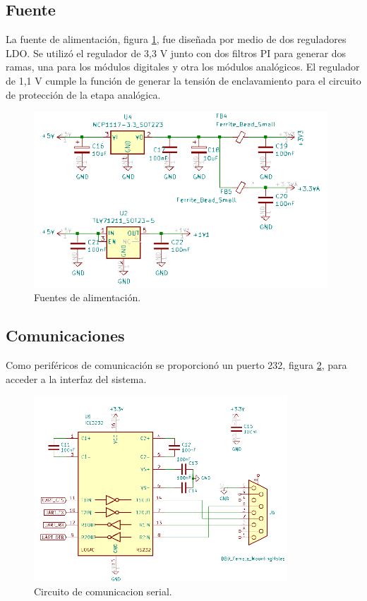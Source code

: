 \subsection{Fuente}

La fuente de alimentación, figura \ref{fig:schPwr}, fue diseñada por medio de dos reguladores LDO. Se utilizó el regulador de 3,3 V junto con dos filtros PI para generar dos ramas, una para los módulos digitales y otra los módulos analógicos. El regulador de 1,1 V cumple la función de generar la tensión de enclavamiento para el circuito de protección de la etapa analógica.


\begin{figure}[ht]
	\centering
	\includegraphics[width=110mm]{./Figures/schPwr.png}
	\caption{Fuentes de alimentación.}
	\label{fig:schPwr}
\end{figure}

\vspace{5mm}

\subsection{Comunicaciones}

Como periféricos de comunicación se proporcionó un puerto 232, figura \ref{fig:schSerial}, para acceder a la interfaz del sistema. 

\begin{figure}[ht]
	\centering
	\includegraphics[width=95mm]{./Figures/schSerial.png}
	\caption{Circuito de comunicacion serial.}
	\label{fig:schSerial}
\end{figure}

